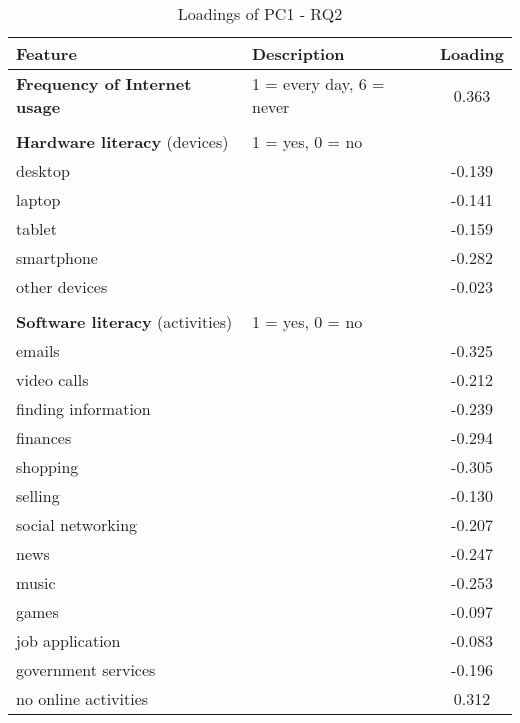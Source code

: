 \documentclass[12pt]{article}
\begin{document}
    \begin{table}[h!]
        \centering
        \caption{Loadings of PC1 - RQ2}
        \label{tab:pc1_loadings_rq2}
        \begin{tabular}{llc}
            \toprule
            Feature & Description & Loading \\
            \midrule
            \textbf{Frequency of Internet usage} & 1 = every day, 6 = never & 0.363 \\
            & & \\
            \textbf{Hardware literacy} (devices) & 1 = yes, 0 = no & \\
            desktop &  & -0.139 \\
            laptop &  & -0.141 \\
            tablet &  & -0.159 \\
            smartphone &  & -0.282 \\
            other devices &  & -0.023 \\
            & & \\
            \textbf{Software literacy} (activities) & 1 = yes, 0 = no & \\
            emails &  & -0.325 \\
            video calls &  & -0.212 \\
            finding information &  & -0.239 \\
            finances &  & -0.294 \\
            shopping &  & -0.305 \\
            selling &  & -0.130 \\
            social networking &  & -0.207 \\
            news &  & -0.247 \\
            music &  & -0.253 \\
            games &  & -0.097 \\
            job application &  & -0.083 \\
            government services &  & -0.196 \\
            no online activities &  & 0.312 \\
            \bottomrule
        \end{tabular}
    \end{table}
\end{document}
